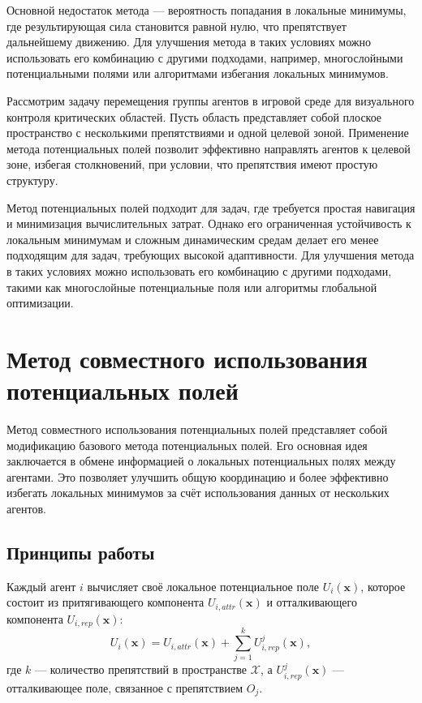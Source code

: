 Основной недостаток метода — вероятность попадания в локальные минимумы, где результирующая сила становится равной нулю, что препятствует дальнейшему движению. Для улучшения метода в таких условиях можно использовать его комбинацию с другими подходами, например, многослойными потенциальными полями или алгоритмами избегания локальных минимумов.

Рассмотрим задачу перемещения группы агентов в игровой среде для визуального контроля критических областей. Пусть область представляет собой плоское пространство с несколькими препятствиями и одной целевой зоной. Применение метода потенциальных полей позволит эффективно направлять агентов к целевой зоне, избегая столкновений, при условии, что препятствия имеют простую структуру.

Метод потенциальных полей подходит для задач, где требуется простая навигация и минимизация вычислительных затрат. Однако его ограниченная устойчивость к локальным минимумам и сложным динамическим средам делает его менее подходящим для задач, требующих высокой адаптивности. Для улучшения метода в таких условиях можно использовать его комбинацию с другими подходами, такими как многослойные потенциальные поля или алгоритмы глобальной оптимизации.

\section{Метод совместного использования потенциальных полей}

Метод совместного использования потенциальных полей представляет собой модификацию базового метода потенциальных полей. Его основная идея заключается в обмене информацией о локальных потенциальных полях между агентами. Это позволяет улучшить общую координацию и более эффективно избегать локальных минимумов за счёт использования данных от нескольких агентов.

\subsection{Принципы работы}

Каждый агент \(i\) вычисляет своё локальное потенциальное поле \(U_i(\mathbf{x})\), которое состоит из притягивающего компонента \(U_{i,attr}(\mathbf{x})\) и отталкивающего компонента \(U_{i,rep}(\mathbf{x})\):
\[
U_i(\mathbf{x}) = U_{i,attr}(\mathbf{x}) + \sum_{j=1}^k U_{i,rep}^j(\mathbf{x}),
\]
где \(k\) — количество препятствий в пространстве \( \mathcal{X} \), а \(U_{i,rep}^j(\mathbf{x})\) — отталкивающее поле, связанное с препятствием \(O_j\).

